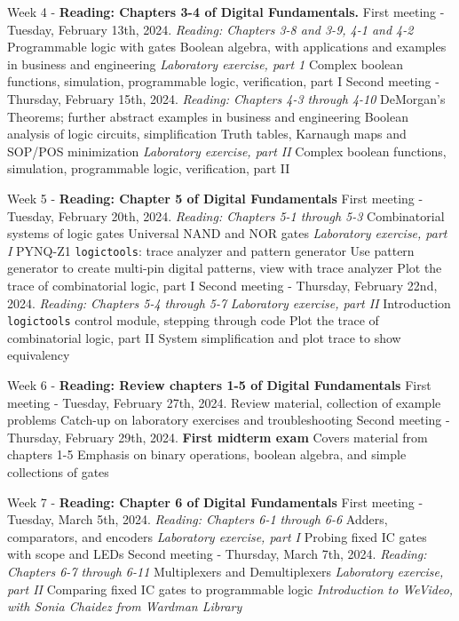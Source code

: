 \documentclass[10pt]{article}
\begin{document}
\begin{outline}[enumerate]
\1 Week 4 - \textbf{Reading: Chapters 3-4 of Digital Fundamentals.}
\2 First meeting - Tuesday, February 13th, 2024. \textit{Reading: Chapters 3-8 and 3-9, 4-1 and 4-2}
\3 Programmable logic with gates
\3 Boolean algebra, with applications and examples in business and engineering
\3 \textit{Laboratory exercise, part 1}
\4 Complex boolean functions, simulation, programmable logic, verification, part I
\2 Second meeting - Thursday, February 15th, 2024.  \textit{Reading: Chapters 4-3 through 4-10}
\3 DeMorgan's Theorems; further abstract examples in business and engineering
\3 Boolean analysis of logic circuits, simplification
\3 Truth tables, Karnaugh maps and SOP/POS minimization
\3 \textit{Laboratory exercise, part II}
\4 Complex boolean functions, simulation, programmable logic, verification, part II

\1 Week 5 - \textbf{Reading: Chapter 5 of Digital Fundamentals}
\2 First meeting - Tuesday, February 20th, 2024. \textit{Reading:  Chapters 5-1 through 5-3}
\3 Combinatorial systems of logic gates
\3 Universal NAND and NOR gates
\3 \textit{Laboratory exercise, part I}
\4 PYNQ-Z1 \verb+logictools+: trace analyzer and pattern generator
\4 Use pattern generator to create multi-pin digital patterns, view with trace analyzer
\4 Plot the trace of combinatorial logic, part I
\2 Second meeting - Thursday, February 22nd, 2024. \textit{Reading: Chapters 5-4 through 5-7}
\3 \textit{Laboratory exercise, part II}
\4 Introduction \verb+logictools+ control module, stepping through code
\4 Plot the trace of combinatorial logic, part II
\4 System simplification and plot trace to show equivalency

\1 Week 6 - \textbf{Reading: Review chapters 1-5 of Digital Fundamentals}
\2 First meeting - Tuesday, February 27th, 2024.
\3 Review material, collection of example problems
\3 Catch-up on laboratory exercises and troubleshooting
\2 Second meeting - Thursday, February 29th, 2024.
\3 \textbf{First midterm exam}
\4 Covers material from chapters 1-5
\4 Emphasis on binary operations, boolean algebra, and simple collections of gates

\1 Week 7 - \textbf{Reading: Chapter 6 of Digital Fundamentals}
\2 First meeting - Tuesday, March 5th, 2024. \textit{Reading: Chapters 6-1 through 6-6}
\3 Adders, comparators, and encoders
\3 \textit{Laboratory exercise, part I}
\4 Probing fixed IC gates with scope and LEDs
\2 Second meeting - Thursday, March 7th, 2024. \textit{Reading: Chapters 6-7 through 6-11}
\3 Multiplexers and Demultiplexers
\3 \textit{Laboratory exercise, part II}
\4 Comparing fixed IC gates to programmable logic
\4 \textit{Introduction to WeVideo, with Sonia Chaidez from Wardman Library}


\end{outline}
\end{document}
